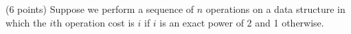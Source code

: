 \documentclass[paper=a4, fontsize=11pt]{scrartcl} %
\begin{document}
\maketitle %

\section{}

\begin{fancyquotes}
  (6 points) Suppose we perform a sequence of $n$ operations on a data
  structure in which the $i$th operation cost is $i$ if $i$ is an
  exact power of 2 and 1 otherwise.
\end{fancyquotes}
\end{document}
